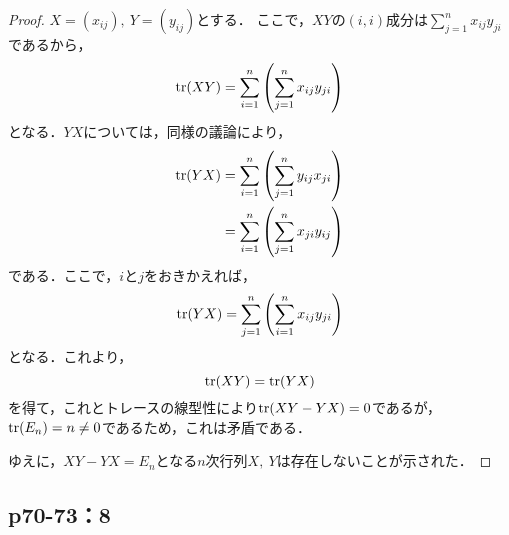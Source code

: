 \documentclass[uplatex,dvipdfmx,a4paper,11pt,fleqn]{jsarticle}
\begin{document}
\begin{tleftbar}
\begin{proof}
$X=(x_{ij}),~Y=(y_{ij})$とする．
ここで，$XY$の$(i,i)$成分は$\sum_{j=1}^{n} x_{ij} y_{ji}$であるから，
\begin{equation*}
\tr (XY)  =  \sum_{i=1}^{n} \left( \sum_{j=1}^{n} x_{ij} y_{ji} \right)
\end{equation*}
となる．$YX$については，同様の議論により，
\begin{align*}
\tr  (YX) & =  \sum_{i=1}^{n}\left( \sum_{j=1}^{n}  y_{ij} x_{ji} \right) \\
 & =  \sum_{i=1}^{n} \left( \sum_{j=1}^{n}  x_{ji} y_{ij} \right)
\end{align*}
である．ここで，$i$と$j$をおきかえれば，
\begin{equation}
\tr  (YX) = \sum_{j=1}^{n} \left( \sum_{i=1}^{n}  x_{ij} y_{ji} \right)
\end{equation}
となる．これより，
\begin{equation}
\tr (XY) = \tr  (YX)
\end{equation}
を得て，これとトレースの線型性により$\tr (XY-YX) =0$であるが，$\tr  (E_n) =n \neq 0$であるため，これは矛盾である．

ゆえに，$XY-YX=E_n$となる$n$次行列$X,~Y$は存在しないことが示された．
\end{proof}
\end{tleftbar}

\newpage 

\subsection*{p70-73：8}
\end{document}

